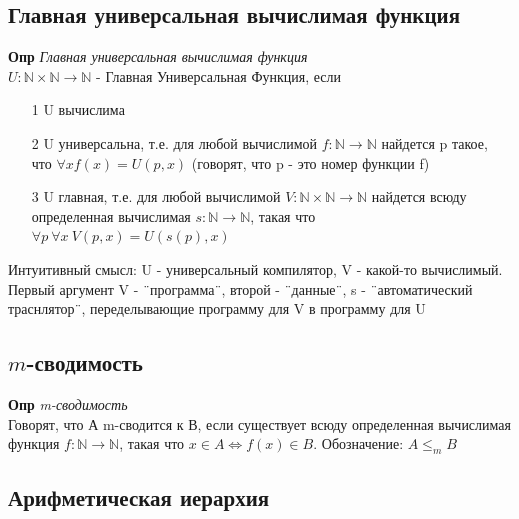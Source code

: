 \subsection{Главная универсальная вычислимая функция}

\textbf{Опр} \textit{Главная универсальная вычислимая функция}\\
$U:\mathbb{N}\times\mathbb{N} \rightarrow \mathbb{N}$ - Главная Универсальная Функция, если
\begin{itemize}
    \item[1] U вычислима
     \item[2] U универсальна, т.е. для любой вычислимой $f:\mathbb{N} \rightarrow \mathbb{N} $ найдется p такое, что $\forall x f(x) = U(p,x)$ (говорят, что p - это номер функции f)
     \item[3] U главная, т.е. для любой вычислимой $V: \mathbb{N}\times\mathbb{N} \rightarrow \mathbb{N}$ найдется всюду определенная вычислимая $s:\mathbb{N} \rightarrow \mathbb{N}$, такая что $\forall p \ \forall x \ V(p,x) = U(s(p),x)$
\end{itemize}
Интуитивный смысл: U - универсальный компилятор, V - какой-то вычислимый. Первый аргумент V - \" \ программа\" \ , второй - \" \ данные\" \ , s - \" \ автоматический траснлятор\" \ , переделывающие программу для V в программу для U

\subsection{$m$-сводимость}

\textbf{Опр} \textit{m-сводимость}\\
Говорят, что А m-сводится к В, если существует всюду определенная вычислимая функция $f:\mathbb{N} \rightarrow \mathbb{N}$, такая что $x \in A \Longleftrightarrow f(x) \in B$. Обозначение: $A\leq_m B$

\subsection{Арифметическая иерархия}

